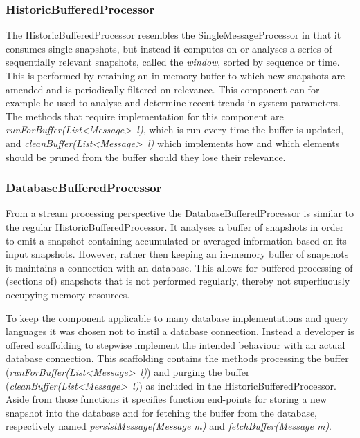 \subsubsection*{HistoricBufferedProcessor}
The HistoricBufferedProcessor resembles the SingleMessageProcessor in that it consumes single snapshots, but instead it computes on or analyses a series of sequentially relevant snapshots, called the \emph{window}, sorted by sequence or time. This is performed by retaining an in-memory buffer to which new snapshots are amended and is periodically filtered on relevance. This component can for example be used to analyse and determine recent trends in system parameters. The methods that require implementation for this component are \emph{runForBuffer(List\textless Message\textgreater\ l)}, which is run every time the buffer is updated, and \emph{cleanBuffer(List\textless Message\textgreater\ l)} which implements how and which elements should be pruned from the buffer should they lose their relevance.

\subsubsection{DatabaseBufferedProcessor}
From a stream processing perspective the DatabaseBufferedProcessor is similar to the regular HistoricBufferedProcessor. It analyses a buffer of snapshots in order to emit a snapshot containing accumulated or averaged information based on its input snapshots. However, rather then keeping an in-memory buffer of snapshots it maintains a connection with an database. This allows for buffered processing of (sections of) snapshots that is not performed regularly, thereby not superfluously occupying memory resources.

To keep the component applicable to many database implementations and query languages it was chosen not to instil a database connection. Instead a developer is offered scaffolding to stepwise implement the intended behaviour with an actual  database connection. This scaffolding contains the methods processing the buffer (\emph{runForBuffer(List\textless Message\textgreater\ l)}) and purging the buffer (\emph{cleanBuffer(List\textless Message\textgreater\ l)}) as included in the HistoricBufferedProcessor. Aside from those functions it specifies function end-points for storing a new snapshot into the database and for fetching the buffer from the database, respectively named \emph{persistMessage(Message m)} and \emph{fetchBuffer(Message m)}.	

